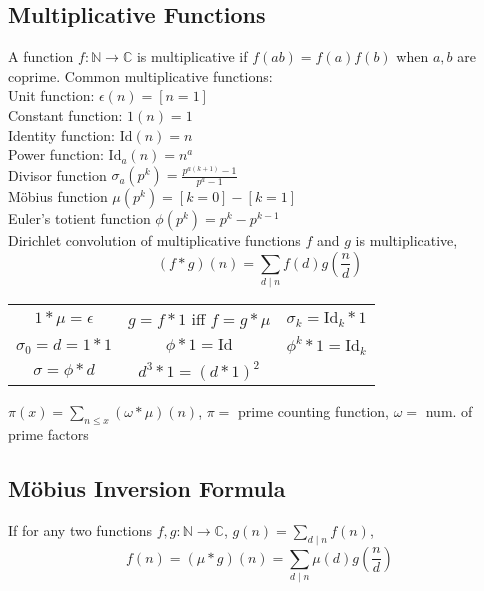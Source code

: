 \subsection{Multiplicative Functions}
A function $f : \mathbb{N} \to \mathbb{C}$ is multiplicative if
$f(ab) = f(a)f(b)$ when $a, b$ are coprime.
Common multiplicative functions: \\
Unit function: $\epsilon(n) = [n = 1]$ \\
Constant function: $1(n) = 1$ \\ 
Identity function: $\mathrm{Id}(n) = n$ \\
Power function: $\mathrm{Id}_a(n) = n^a$ \\
Divisor function $\sigma_a(p^k) = \frac{p^{a(k+1)} - 1}{p^a - 1}$ \\
Möbius function $\mu(p^k) = [k = 0] - [k = 1]$ \\
Euler's totient function $\phi(p^k) = p^k - p^{k-1}$ \\
Dirichlet convolution of multiplicative functions $f$ and $g$ is multiplicative,
\[ (f*g)(n) = \sum_{d \mid n} f(d) g\left(\frac{n}{d}\right) \]
\begin{center}
    \begin{tabular}{ c c c }
        $1 * \mu = \epsilon$ & $g = f * 1$ iff $f = g * \mu$ & $\sigma_k = \mathrm{Id}_k * 1$ \\
        $\sigma_0 = d = 1 * 1$ & $\phi * 1 = \mathrm{Id}$ & $\phi^k * 1 = \mathrm{Id}_k$ \\
        $\sigma = \phi * d$ & $d^3 * 1 = (d * 1)^2$ & 
    \end{tabular}
\end{center}
$\pi(x) = \sum_{n \leq x} (\omega * \mu)(n)$, $\pi = $ prime counting function, $\omega = $ num. of prime factors \\
\subsection{Möbius Inversion Formula}
    If for any two functions $f, g : \mathbb{N} \to \mathbb{C}$, $g(n) = \sum_{d \mid n} f(n)$,
    \[ f(n) = (\mu * g)(n) = \sum_{d \mid n} \mu(d) g \left(\frac{n}{d}\right) \]
